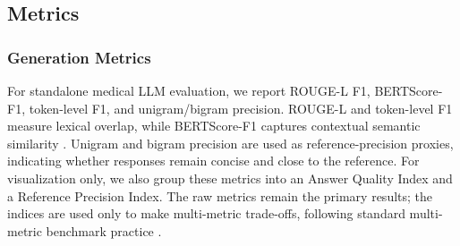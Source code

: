 \documentclass[conference]{IEEEtran}
\begin{document}
\subsection{Metrics}
\subsubsection{Generation Metrics}
For standalone medical LLM evaluation, we report ROUGE-L F1, BERTScore-F1, token-level F1, and unigram/bigram precision. ROUGE-L and token-level F1 measure lexical overlap, while BERTScore-F1 captures contextual semantic similarity \cite{lin2004rouge,bertscore}. Unigram and bigram precision are used as reference-precision proxies, indicating whether responses remain concise and close to the reference. For visualization only, we also group these metrics into an Answer Quality Index and a Reference Precision Index. The raw metrics remain the primary results; the indices are used only to make multi-metric trade-offs, following standard multi-metric benchmark practice \cite{wang2018glue,wang2019superglue,liang2023holistic,muennighoff2023mteb}.
\end{document}
